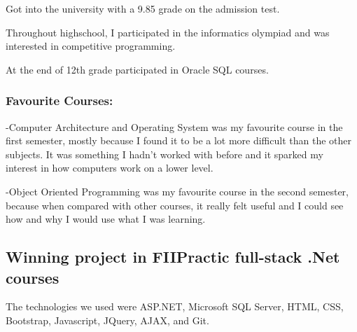 \documentclass[a4paper,hidelinks,12pt]{article}
\begin{document}
Got into the university with a 9.85 grade on the admission test.

Throughout highschool, I participated in the informatics olympiad and was interested in competitive programming.

At the end of 12th grade participated in Oracle SQL courses.
 
 \subsubsection{Favourite Courses:} 
 -Computer Architecture and Operating System was my favourite course in the first semester, mostly because I 
 found it to be a lot more difficult than the other subjects. It was something I hadn't worked with before
 and it sparked my interest in how computers work on a lower level.

 -Object Oriented Programming was my favourite course in the second semester, because when compared
 with other courses, it really felt useful and I could see how and why I would use what I was learning.


\subsection{Winning project in FIIPractic full-stack .Net courses}

The technologies we used were ASP.NET, Microsoft SQL Server, HTML, CSS, Bootstrap, Javascript,
JQuery, AJAX, and Git. 
\end{document}
